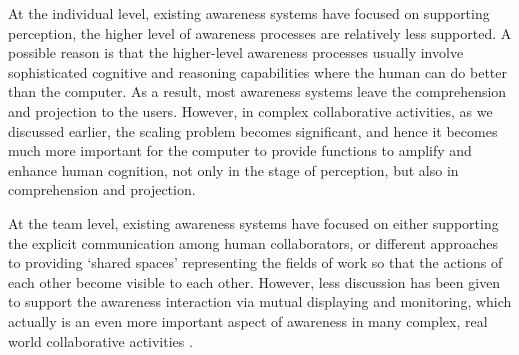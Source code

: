 At the individual level, existing awareness systems have focused on supporting perception, the higher level of awareness processes are relatively less supported. A possible reason is that the higher-level awareness processes usually involve sophisticated cognitive and reasoning capabilities where the human can do better than the computer. As a result, most awareness systems leave the comprehension and projection to the users. However, in complex collaborative activities, as we discussed earlier, the scaling problem becomes significant, and hence it becomes much more important for the computer to provide functions to amplify and enhance human cognition, not only in the stage of perception, but also in comprehension and projection. 

At the team level, existing awareness systems have focused on either supporting the explicit communication among human collaborators, or different approaches to providing `shared spaces' representing the fields of work so that the actions of each other become visible to each other. However, less discussion has been given to support the awareness interaction via mutual displaying and monitoring, which actually is an even more important aspect of awareness in many complex, real world collaborative activities \cite{heath2002a}.






 

